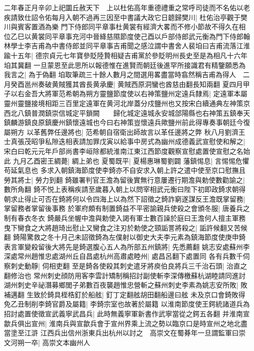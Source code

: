 二年春正月辛卯上祀圜丘赦天下　上以杜佑高年重德禮重之常呼司徒而不名佑以老疾請致仕詔令佑每月入朝不過再三因至中書議大政它日聼歸樊川|{
	杜佑治亭觀于樊川與賓客置酒為樂}
門下侍郎同平章事杜黄裳有經濟大畧而不修小節故不得久在相位乙巳以黄裳同平章事充河中晉絳慈隰節度使己酉以戶部侍郎武元衡為門下侍郎翰林學士李吉甫為中書侍郎並同平章事吉甫聞之感泣謂中書舍人裴垍曰吉甫流落江淮踰十五年|{
	德宗貞元七年寶參貶陸贄相疑吉甫黨於參貶明州長史至是為相凡十六年垍其冀翻}
一旦蒙恩至此思所以報德惟在進賢而朝廷後進罕所接識君有精鑒願悉為我言之|{
	為于偽翻}
垍取筆疏三十餘人數月之間選用畧盡當時翕然稱吉甫為得人　二月癸酉邕州奏破黄賊獲其酋長黄承慶|{
	黄賊西原洞蠻也酋慈由翻長知兩翻}
夏四月甲子以右金吾大將軍范希朝為朔方靈鹽節度使以右神策鹽州定遠兵隸焉|{
	定遠軍本屬靈州靈鹽接境相距三百里定遠軍在黄河北岸蓋分戍鹽州也又按宋白續通典左神策京西北八鎮普潤鎮崇信城定平鎖闕　　歸化城定遠城永安城郃陽縣也右神策五鎮奉天鎮麟游鎮良原鎮慶州鎮懷遠城也今曰右神策豈懷遠兵歟鹽州前此得專奏事朝廷今復屬朔方}
以革舊弊任邊將也|{
	范希朝自宿衛出師故言以革任邊將之弊}
秋八月劉濟王士真張茂昭爭私隙迭相表請加罪戊寅以給事中房式為幽州成德義武宣慰使和解之|{
	宋白曰乾元元年戶部尚書李峘除都統淮南江東江西節度觀察宣慰處置使宣慰之名始此}
九月乙酉密王綢薨|{
	綢上弟也}
夏蜀既平|{
	夏楊惠琳蜀劉闢}
藩鎮惕息|{
	言惕惕危懼苟延氣息也}
多求入朝鎮海節度使李錡亦不自安求入朝上許之遣中使至京口慰撫且勞其將士|{
	勞力到翻}
錡雖署判官王澹為留後實無行意屢遷行期澹與勅使數勸諭之|{
	數所角翻}
錡不悦上表稱疾請至歲暮入朝上以問宰相武元衡曰陛下初即政錡求朝得朝求止得止可否在錡將何以令四海上以為然下詔徵之錡詐窮遂謀反王澹既掌留務|{
	掌留務者掌留後事務}
於軍府頗有制置錡益不平密諭親兵使殺之會頒冬服|{
	唐養兵之制有春衣冬衣}
錡嚴兵坐幄中澹與勅使入謁有軍士數百譟於庭曰王澹何人擅主軍務曳下臠食之大將趙琦出慰止又臠食之注刃於勅使之頸詬詈將殺之|{
	詬許候翻又苦候翻}
錡陽驚救之冬十月己未詔徵錡為左僕射以御史大夫李元素為鎮海節度使庚申錡表言軍變殺留後大將先是錡選腹心五人為所部五州鎮將|{
	先悉薦翻}
姚志安處蘇州李深處常州趙惟忠處湖州丘自昌處杭州高肅處睦州|{
	處昌呂翻下處置同}
各有兵數千伺察刺史動靜|{
	伺相吏翻}
至是錡各使殺其刺史遣牙將庾伯良將兵三千治石頭|{
	治直之翻修治也}
常州刺史顔防用客李雲計矯制稱招討副使斬李深傳檄蘇杭湖睦請同進討湖州刺史辛祕潛募鄉閭子弟數百夜襲趙惟忠營斬之蘇州刺史李素為姚志安所敗|{
	敗補邁翻}
生致於錡具桎梏釘於船舷|{
	釘丁定翻舷胡田翻船邊曰舷}
未及京口會錡敗得免乙丑制削李錡官爵及屬籍|{
	李錡宗室也故著於屬籍}
以淮南節度使王鍔統諸道兵為招討處置使徵宣武義寧武昌兵|{
	此時無義寧軍新書作武寧當從之鍔五各翻}
并淮南宣歙兵俱出宣州|{
	淮南兵與宣歙兵會于宣州界乘上流之勢以臨京口是時宣州之地北盡當塗至江滸}
江西兵出信州浙東兵出杭州以討之　高崇文在蜀朞年一旦謂監軍曰崇文河朔一卒|{
	高崇文本幽州人}
